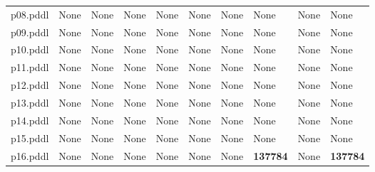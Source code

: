 \documentclass{article}
\begin{document}
\begin{tabular}{@{}lrrrrrrrrr@{}}
p08.pddl & \multicolumn{1}{|l|}{None} & \multicolumn{1}{|l|}{None} & \multicolumn{1}{|l|}{None} & \multicolumn{1}{|l|}{None} & \multicolumn{1}{|l|}{None} & \multicolumn{1}{|l|}{None} & \multicolumn{1}{|l|}{None} & \multicolumn{1}{|l|}{None} & \multicolumn{1}{|l|}{None} \\
p09.pddl & \multicolumn{1}{|l|}{None} & \multicolumn{1}{|l|}{None} & \multicolumn{1}{|l|}{None} & \multicolumn{1}{|l|}{None} & \multicolumn{1}{|l|}{None} & \multicolumn{1}{|l|}{None} & \multicolumn{1}{|l|}{None} & \multicolumn{1}{|l|}{None} & \multicolumn{1}{|l|}{None} \\
p10.pddl & \multicolumn{1}{|l|}{None} & \multicolumn{1}{|l|}{None} & \multicolumn{1}{|l|}{None} & \multicolumn{1}{|l|}{None} & \multicolumn{1}{|l|}{None} & \multicolumn{1}{|l|}{None} & \multicolumn{1}{|l|}{None} & \multicolumn{1}{|l|}{None} & \multicolumn{1}{|l|}{None} \\
p11.pddl & \multicolumn{1}{|l|}{None} & \multicolumn{1}{|l|}{None} & \multicolumn{1}{|l|}{None} & \multicolumn{1}{|l|}{None} & \multicolumn{1}{|l|}{None} & \multicolumn{1}{|l|}{None} & \multicolumn{1}{|l|}{None} & \multicolumn{1}{|l|}{None} & \multicolumn{1}{|l|}{None} \\
p12.pddl & \multicolumn{1}{|l|}{None} & \multicolumn{1}{|l|}{None} & \multicolumn{1}{|l|}{None} & \multicolumn{1}{|l|}{None} & \multicolumn{1}{|l|}{None} & \multicolumn{1}{|l|}{None} & \multicolumn{1}{|l|}{None} & \multicolumn{1}{|l|}{None} & \multicolumn{1}{|l|}{None} \\
p13.pddl & \multicolumn{1}{|l|}{None} & \multicolumn{1}{|l|}{None} & \multicolumn{1}{|l|}{None} & \multicolumn{1}{|l|}{None} & \multicolumn{1}{|l|}{None} & \multicolumn{1}{|l|}{None} & \multicolumn{1}{|l|}{None} & \multicolumn{1}{|l|}{None} & \multicolumn{1}{|l|}{None} \\
p14.pddl & \multicolumn{1}{|l|}{None} & \multicolumn{1}{|l|}{None} & \multicolumn{1}{|l|}{None} & \multicolumn{1}{|l|}{None} & \multicolumn{1}{|l|}{None} & \multicolumn{1}{|l|}{None} & \multicolumn{1}{|l|}{None} & \multicolumn{1}{|l|}{None} & \multicolumn{1}{|l|}{None} \\
p15.pddl & \multicolumn{1}{|l|}{None} & \multicolumn{1}{|l|}{None} & \multicolumn{1}{|l|}{None} & \multicolumn{1}{|l|}{None} & \multicolumn{1}{|l|}{None} & \multicolumn{1}{|l|}{None} & \multicolumn{1}{|l|}{None} & \multicolumn{1}{|l|}{None} & \multicolumn{1}{|l|}{None} \\
p16.pddl & \multicolumn{1}{|l|}{None} & \multicolumn{1}{|l|}{None} & \multicolumn{1}{|l|}{None} & \multicolumn{1}{|l|}{None} & \multicolumn{1}{|l|}{None} & \multicolumn{1}{|l|}{None} & \textbf{137784} & \multicolumn{1}{|l|}{None} & \textbf{137784} \\

\end{tabular}
\end{document}
